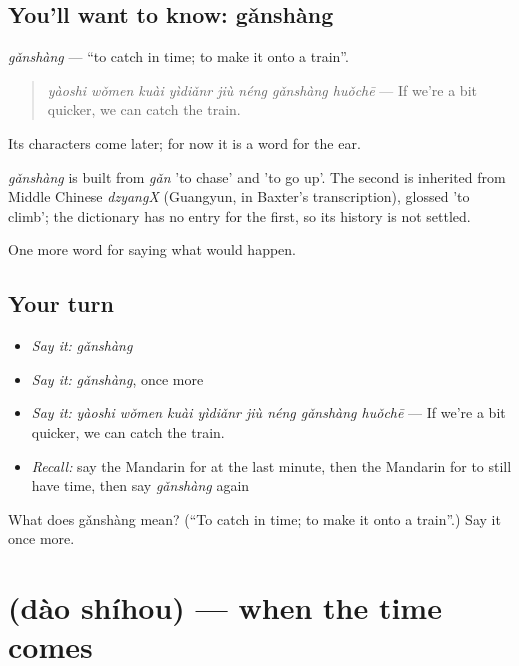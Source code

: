 \subsection*{You'll want to know: gǎnshàng}
\emph{gǎnshàng} — \textquotedblleft{}to catch in time; to make it onto a train\textquotedblright{}.

\begin{quote}
\emph{yàoshi wǒmen kuài yìdiǎnr jiù néng gǎnshàng huǒchē} — If we're a bit quicker, we can catch the train.
\end{quote}

Its characters come later; for now it is a word for the ear.

\begin{cousinweb}
\emph{gǎnshàng} is built from \emph{gǎn} 'to chase' and  'to go up'. The second is inherited from Middle Chinese \emph{dzyangX} (Guangyun, in Baxter's transcription), glossed 'to climb'; the dictionary has no entry for the first, so its history is not settled.
\end{cousinweb}

\begin{grammarlens}[title={What you've built}]
One more word for saying what would happen.
\end{grammarlens}

\subsection*{Your turn}
\begin{itemize}
\raggedright
  \item \emph{Say it:} \emph{gǎnshàng}
  \item \emph{Say it:} \emph{gǎnshàng}, once more
  \item \emph{Say it:} \emph{yàoshi wǒmen kuài yìdiǎnr jiù néng gǎnshàng huǒchē} — If we're a bit quicker, we can catch the train.
  \item \emph{Recall:} say the Mandarin for at the last minute, then the Mandarin for to still have time, then say \emph{gǎnshàng} again
\end{itemize}

\begin{tcolorbox}[breakable,colback=teal!4,colframe=teal!35!black,title={Before you move on}]
What does gǎnshàng mean? (\textquotedblleft{}To catch in time; to make it onto a train\textquotedblright{}.) Say it once more.
\end{tcolorbox}
\section[\texorpdfstring{\zh{到时候} (dào shíhou)}{到时候 (dào shíhou)}]{ (dào shíhou) — when the time comes}


